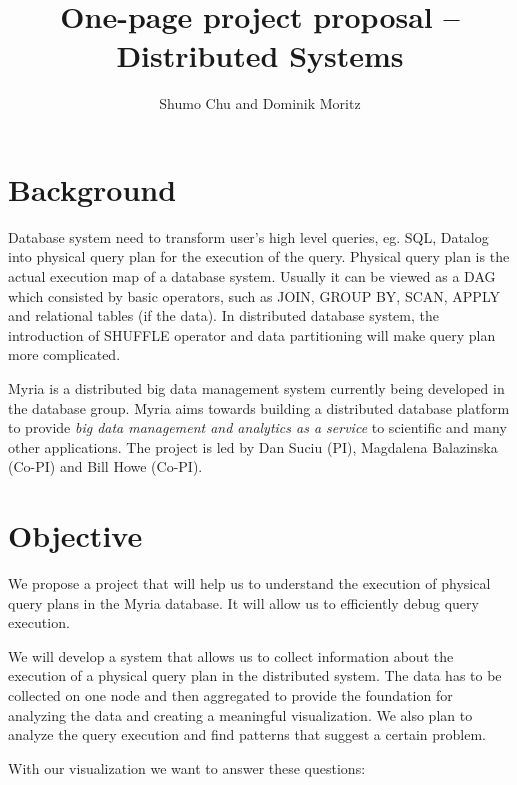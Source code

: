 \documentclass[11pt]{article}
\begin{document}

\title{One-page project proposal \--- Distributed Systems}
\author{Shumo Chu and Dominik Moritz}
\date{}

\maketitle

\section*{Background}

Database system need to transform user's high level queries, eg. SQL, Datalog into physical query plan for the execution of the query. Physical query plan is the actual execution map of a database system. Usually it can be viewed as a DAG which consisted by basic operators, such as JOIN, GROUP BY, SCAN, APPLY and relational tables (if the data). In distributed database system, the introduction of SHUFFLE operator and data partitioning will make query plan more complicated.

Myria is a distributed big data management system currently being developed in the database group. Myria aims towards building a distributed database platform to provide \emph{big data management and analytics as a service} to scientific and many other applications. The project is led by Dan Suciu (PI), Magdalena Balazinska (Co-PI) and Bill Howe (Co-PI).


\section*{Objective}

We propose a project that will help us to understand the execution of physical query plans in the Myria database. It will allow us to efficiently debug query execution.

We will develop a system that allows us to collect information about the execution of a physical query plan in the distributed system. The data has to be collected on one node and then aggregated to provide the foundation for analyzing the data and creating a meaningful visualization. We also plan to analyze the query execution and find patterns that suggest a certain problem.

With our visualization we want to answer these questions:
\end{document}
